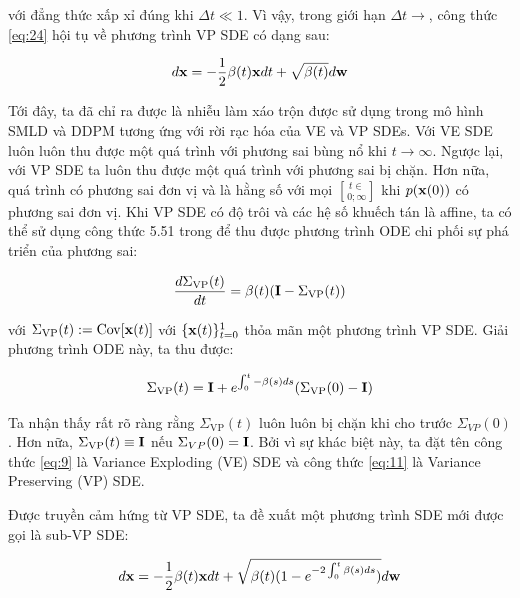 \documentclass{article} %
\begin{document}
với đẳng thức xấp xỉ đúng khi $\Delta t \ll 1$.
Vì vậy, trong giới hạn $\Delta t \rightarrow$, công thức \ref{eq:24} hội tụ về phương trình VP SDE có dạng sau:

\begin{equation} \label{eq:25}
    d \bold{x} = - \dfrac{1}{2} \beta(t) \bold{x} dt + \sqrt{\beta(t)} d \bold{w}
\end{equation}

Tới đây, ta đã chỉ ra được là nhiễu làm xáo trộn được sử dụng trong mô hình SMLD và DDPM tương ứng với rời rạc hóa của VE và VP SDEs.
Với VE SDE luôn luôn thu được một quá trình với phương sai bùng nổ khi $t \rightarrow \infty$.
Ngược lại, với VP SDE ta luôn thu được một quá trình với phương sai bị chặn.
Hơn nữa, quá trình có phương sai đơn vị và là hằng số với mọi $t \in \brack 0;\infty $ khi $p(\bold{x}(0))$ có phương sai đơn vị.
Khi VP SDE có độ trôi và các hệ số khuếch tán là affine, ta có thể sử dụng công thức 5.51 trong \citep{sarkka2019applied} để thu được phương trình ODE chi phối sự phá triển của phương sai:

\begin{equation*}
    \dfrac{d \Sigma_{\mathrm{VP}}(t)}{dt} = \beta(t) (\bold{I} - \Sigma_{\mathrm{VP}}(t))
\end{equation*}

với $\Sigma_{\mathrm{VP}}(t) := \mathrm{Cov} \lbrack \bold{x}(t) \rbrack$ với $\lbrace \bold{x}(t) \rbrace_{t=0}^1$ thỏa mãn một phương trình VP SDE.
Giải phương trình ODE này, ta thu được:

\begin{equation} \label{eq:26}
    \Sigma_{\mathrm{VP}}(t) = \bold{I} + e^{\int_{0}^t - \beta(s)ds} (\Sigma_{\mathrm{VP}}(0) - \bold{I})
\end{equation}

Ta nhận thấy rất rõ ràng rằng $\Sigma_{\mathrm{VP}}(t)$ luôn luôn bị chặn khi cho trước $\Sigma_{VP}(0)$.
Hơn nữa, $\Sigma_{\mathrm{VP}}(t) \equiv \bold{I}$ nếu $\Sigma_{VP}(0) = \bold{I}$.
Bởi vì sự khác biệt này, ta đặt tên công thức \ref{eq:9} là Variance Exploding (VE) SDE và công thức \ref{eq:11} là Variance Preserving (VP) SDE.

Được truyền cảm hứng từ VP SDE, ta đề xuất một phương trình SDE mới được gọi là sub-VP SDE:

\begin{equation} \label{eq:26}
    d \bold{x} = - \dfrac{1}{2} \beta(t) \bold{x} d t + \sqrt{\beta(t) ( 1 - e^{-2\int_{0}^t \beta(s)ds})} d \bold{w}
\end{equation}
\end{document}
